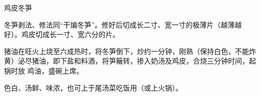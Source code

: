 \begin{recipe}{鸡皮冬笋}

\ingredients


\preparation

\step 冬笋剥法、修法同“干煸冬笋”。修好后切成长二寸、宽一寸的极薄片（越薄越
好）。鸡皮切成长一寸、宽六分的片。

\step 猪油在旺火上烧至六成热时，将冬笋倒下，炒约一分钟，刚熟（保持白色，不能炸
黄）泌尽猪油，即下盐和料酒，将笋簸转，掺入奶汤及鸡皮，合烧三分钟时间，起锅时放
鸡油，盛碗上席。

\features

色白、汤鲜、味浓，也可上于尾汤菜吃饭用（或上火锅）。

\end{recipe}

